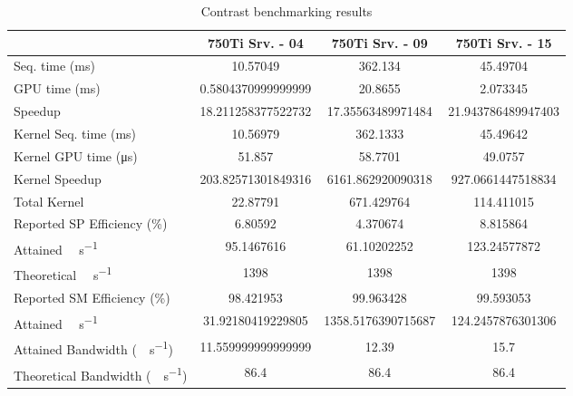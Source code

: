 \begin{table}[H]
	\centering
	\caption{Contrast benchmarking results}
	\label{tab:contrast-results}
	\begin{tabular}{lS[table-format=7.1]S[table-format=7.1]S[table-format=7.1]}
		\toprule
			~ & {\textbf{750Ti Srv. - 04}} & {\textbf{750Ti Srv. - 09}} & {\textbf{750Ti Srv. - 15}} \\
		\midrule
			{Seq. time (\si{\milli\second})} & 10.57049 & 362.134 & 45.49704 \\
			{GPU time (\si{\milli\second})} & 0.5804370999999999 & 20.8655 & 2.073345 \\
			{Speedup} & 18.211258377522732 &17.35563489971484 & 21.943786489947403 \\
		\midrule
			{Kernel Seq. time (\si{\milli\second})} & 10.56979 & 362.1333 & 45.49642 \\
			{Kernel GPU time (\si{\micro\second})} & 51.857 & 58.7701 & 49.0757 \\
			{Kernel Speedup} & 203.82571301849316 & 6161.862920090318 & 927.0661447518834 \\
		\midrule
			{Total Kernel \si{\mega\flops}} & 22.87791 & 671.429764 & 114.411015 \\
			{Reported SP Efficiency (\si{\percent})} & 6.80592 & 4.370674 & 8.815864 \\
			{Attained \si{\giga\flops\per\second}} & 95.1467616 & 61.10202252 & 123.24577872 \\
			{Theoretical \si{\giga\flops\per\second}} & 1398 & 1398 & 1398 \\
		\midrule
			{Reported SM Efficiency (\si{\percent})} & 98.421953 & 99.963428 & 99.593053 \\
			{Attained \si{\giga\iops\per\second}} & 31.92180419229805 & 1358.5176390715687 & 124.2457876301306 \\			
		\midrule
			{Attained Bandwidth (\si{\giga\byte\per\second})} & 11.559999999999999 & 12.39  & 15.7 \\
			{Theoretical Bandwidth (\si{\giga\byte\per\second})}	& 86.4 & 86.4 & 86.4 \\
		\bottomrule
	\end{tabular}
\end{table}